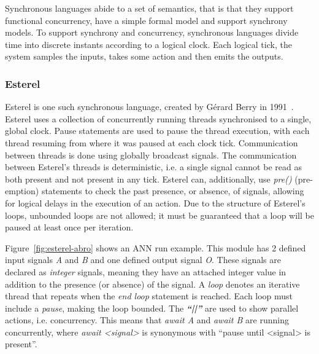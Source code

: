Synchronous languages abide to a set of semantics, that is that they support functional concurrency, have a simple formal model and support synchrony models.
To support synchrony and concurrency, synchronous languages divide time into discrete instants according to a logical clock.
Each logical tick, the system samples the inputs, takes some action and then emits the outputs.

\subsubsection{Esterel}
Esterel is one such synchronous language, created by Gérard Berry in 1991~\cite{berry1991}. 
Esterel uses a collection of concurrently running threads synchronised to a single, global clock.
Pause statements are used to pause the thread execution, with each thread resuming from where it was paused at each clock tick.
Communication between threads is done using globally broadcast signals.
The communication between Esterel's threads is deterministic, i.e. a single signal cannot be read as both present and not present in any tick.
Esterel can, additionally, use \textit{pre()} (pre-emption) statements to check the past presence, or absence, of signals, allowing for logical delays in the execution of an action.
Due to the structure of Esterel's loops, unbounded loops are not allowed; it must be guaranteed that a loop will be paused at least once per iteration.

Figure~\ref{fig:esterel-abro} shows an \ac{ANN} run example.
This module has 2 defined input signals \textit{A} and \textit{B} and one defined output signal \textit{O}.
These signals are declared as \textit{integer} signals, meaning they have an attached integer value in addition to the presence (or absence) of the signal.
A \textit{loop} denotes an iterative thread that repeats when the \textit{end loop} statement is reached.
Each loop must include a \textit{pause}, making the loop bounded. 
The \textbf{\emph{``||''}} are used to show parallel actions, i.e. concurrency.
This means that \textit{await A} and \textit{await B} are running concurrently, where \textit{await <signal>} is synonymous with ``pause until <signal> is present''.

